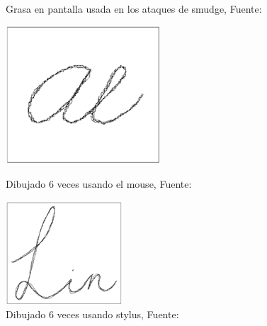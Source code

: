 \begin{anexos}
\begin{figure}[H]
	\caption{Grasa en pantalla usada en los ataques de smudge, Fuente: \cite{aviv2010smudge}}
		\label{smudge-screen}
\end{figure} 

\begin{figure}[H]
	\centering
	\begin{minipage}{0.5\linewidth}  %
		\centering
		\includegraphics[width=0.7\linewidth]{mouse.png} %
		\caption{Dibujado 6 veces usando el mouse, Fuente: \cite{lin2009free}}
		\label{free-draw-train-mouse}
	\end{minipage}%
	\hfill
	\begin{minipage}{0.5\linewidth} %
		\centering
		\includegraphics[width=0.7\linewidth]{stylus.png} %
		\caption{Dibujado 6 veces usando stylus, Fuente: \cite{lin2009free}}
		\label{free-draw-train-stylus}
	\end{minipage}
\end{figure}





\end{anexos}

